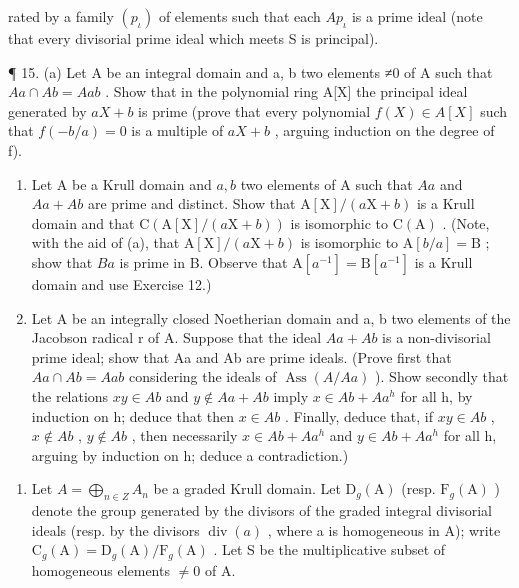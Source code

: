 
rated by a family \((p_{\iota})\) of elements such that each \(A p_{\iota}\) is a prime ideal (note that every divisorial prime ideal which meets S is principal).

¶ 15. (a) Let A be an integral domain and a, b two elements ≠0 of A such that \(Aa \cap Ab = Aab\) . Show that in the polynomial ring A{[}X{]} the principal ideal generated by \(aX + b\) is prime (prove that every polynomial \(f(X) \in A[X]\) such that \(f(-b/a) = 0\) is a multiple of \(aX + b\) , arguing induction on the degree of f).

\begin{enumerate}
\def\labelenumi{(\alph{enumi})}
\setcounter{enumi}{1}
\item
  Let A be a Krull domain and \(a, b\) two elements of A such that \(Aa\) and \(Aa + Ab\) are prime and distinct. Show that \(\mathrm{A}[\mathrm{X}] / (a\mathrm{X} + b)\) is a Krull domain and that \(\mathrm{C}(\mathrm{A}[\mathrm{X}] / (a\mathrm{X} + b))\) is isomorphic to \(\mathrm{C}(\mathrm{A})\) . (Note, with the aid of (a), that \(\mathrm{A}[\mathrm{X}] / (a\mathrm{X} + b)\) is isomorphic to \(\mathrm{A}[b / a] = \mathrm{B}\) ; show that \(Ba\) is prime in B. Observe that \(\mathrm{A}[a^{-1}] = \mathrm{B}[a^{-1}]\) is a Krull domain and use Exercise 12.)
\item
  Let A be an integrally closed Noetherian domain and a, b two elements of the Jacobson radical r of A. Suppose that the ideal \(Aa + Ab\) is a non-divisorial prime ideal; show that Aa and Ab are prime ideals. (Prove first that \(Aa \cap Ab = Aab\) considering the ideals of \(\operatorname{Ass}(A/Aa)\) ). Show secondly that the relations \(xy \in Ab\) and \(y \notin Aa + Ab\) imply \(x \in Ab + Aa^{h}\) for all h, by induction on h; deduce that then \(x \in Ab\) . Finally, deduce that, if \(xy \in Ab\) , \(x \notin Ab\) , \(y \notin Ab\) , then necessarily \(x \in Ab + Aa^{h}\) and \(y \in Ab + Aa^{h}\) for all h, arguing by induction on h; deduce a contradiction.)
\end{enumerate}

\begin{enumerate}
\def\labelenumi{\arabic{enumi}.}
\setcounter{enumi}{15}
\tightlist
\item
  Let \(A = \bigoplus_{n \in Z} A_n\) be a graded Krull domain. Let \(\mathrm{D}_g(\mathrm{A})\) (resp. \(\mathrm{F}_g(\mathrm{A})\) ) denote the group generated by the divisors of the graded integral divisorial ideals (resp. by the divisors \(\operatorname{div}(a)\) , where a is homogeneous in A); write \(\mathrm{C}_g(\mathrm{A}) = \mathrm{D}_g(\mathrm{A}) / \mathrm{F}_g(\mathrm{A})\) . Let S be the multiplicative subset of homogeneous elements \(\neq 0\) of A.
\end{enumerate}

